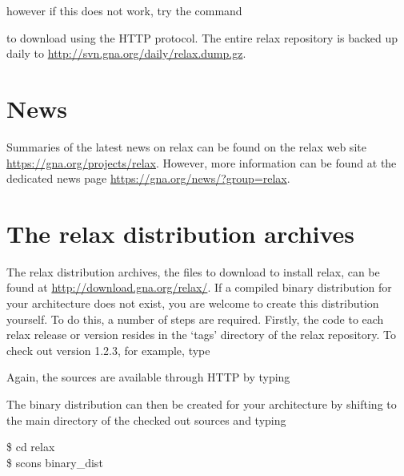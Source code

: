 however if this does not work, try the command


to download using the HTTP protocol.  The entire relax repository is backed up daily to \href{http://svn.gna.org/daily/relax.dump.gz}{http://svn.gna.org/daily/relax.dump.gz}.




\section{News}

Summaries of the latest news on relax can be found on the relax web site \href{https://gna.org/projects/relax}{https://gna.org/projects/relax}.  However, more information can be found at the dedicated news page \href{https://gna.org/news/?group=relax}{https://gna.org/news/?group=relax}.




\section{The relax distribution archives}

The relax distribution archives, the files to download to install relax, can be found at \href{http://download.gna.org/relax/}{http://download.gna.org/relax/}.  If a compiled binary distribution for your architecture does not exist, you are welcome to create this distribution yourself.  To do this, a number of steps are required.  Firstly, the code to each relax release or version resides in the `tags' directory of the relax repository.  To check out version 1.2.3, for example, type


Again, the sources are available through HTTP by typing


The binary distribution can then be created for your architecture by shifting to the main directory of the checked out sources and typing

\begin{exampleenv}
\$ cd relax \\
\$ scons binary\_dist
\end{exampleenv}

